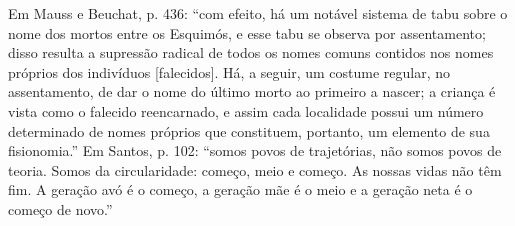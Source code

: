 Em Mauss e Beuchat, p. 436: \enquote{com efeito, há um notável sistema de tabu sobre o nome dos mortos entre os Esquimós, e esse tabu se observa por assentamento; disso resulta a supressão radical de todos os nomes comuns contidos nos nomes próprios dos indivíduos [falecidos]. Há, a seguir, um costume regular, no assentamento, de dar o nome do último morto ao primeiro a nascer; a criança é vista como o falecido reencarnado, e assim cada localidade possui um número determinado de nomes próprios que constituem, portanto, um elemento de sua fisionomia.}
Em Santos, p. 102: \enquote{somos povos de trajetórias, não somos povos de teoria. Somos da circularidade: começo, meio e começo. As nossas vidas não têm fim. A geração avó é o começo, a geração mãe é o meio e a geração neta é o começo de novo.}